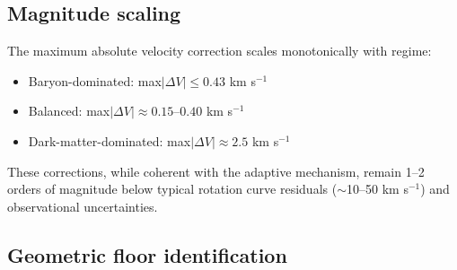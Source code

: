 \documentclass{aa}
\begin{document}
\subsection{Magnitude scaling}

The maximum absolute velocity correction scales monotonically with regime:
\begin{itemize}
	\item Baryon-dominated: max$|\Delta V| \leq 0.43$ km s$^{-1}$
	\item Balanced: max$|\Delta V| \approx 0.15$--$0.40$ km s$^{-1}$
	\item Dark-matter-dominated: max$|\Delta V| \approx 2.5$ km s$^{-1}$
\end{itemize}
These corrections, while coherent with the adaptive mechanism, remain 
1--2 orders of magnitude below typical rotation curve residuals 
($\sim$10--50 km s$^{-1}$) and observational uncertainties.

\subsection{Geometric floor identification}
\end{document}
